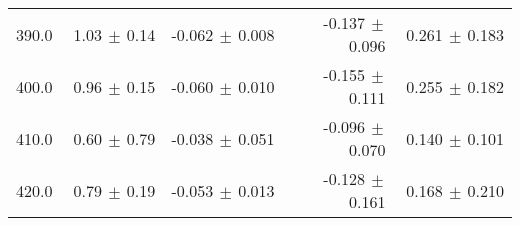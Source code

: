 \begin{table}[htbp]
\begin{center}
\begin{tabular}{|c||r|r||r|r|}
390.0 &  1.03$\,\pm\,$0.14$\;\;\;$ & -0.062$\,\pm\,$0.008$\;\;$ & -0.137$\,\pm\,$0.096$\;$ &  0.261$\,\pm\,$0.183$\;\;$ \\ 
400.0 &  0.96$\,\pm\,$0.15$\;\;\;$ & -0.060$\,\pm\,$0.010$\;\;$ & -0.155$\,\pm\,$0.111$\;$ &  0.255$\,\pm\,$0.182$\;\;$ \\ 
410.0 &  0.60$\,\pm\,$0.79$\;\;\;$ & -0.038$\,\pm\,$0.051$\;\;$ & -0.096$\,\pm\,$0.070$\;$ &  0.140$\,\pm\,$0.101$\;\;$ \\ 
420.0 &  0.79$\,\pm\,$0.19$\;\;\;$ & -0.053$\,\pm\,$0.013$\;\;$ & -0.128$\,\pm\,$0.161$\;$ &  0.168$\,\pm\,$0.210$\;\;$ \\ 
\hline 
\end{tabular} 

\end{center} 
\end{table} 
